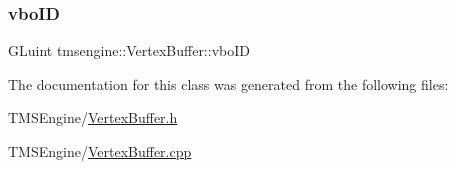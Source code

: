 \mbox{\label{classtmsengine_1_1_vertex_buffer_ab42f1676b7f61ab1b0e3ad9167914c41}} 
\subsubsection{\texorpdfstring{vbo\+ID}{vboID}}
{\footnotesize\ttfamily G\+Luint tmsengine\+::\+Vertex\+Buffer\+::vbo\+ID\hspace{0.3cm}{\ttfamily [private]}}



The documentation for this class was generated from the following files\+:\begin{DoxyCompactItemize}
\item 
T\+M\+S\+Engine/\hyperlink{_vertex_buffer_8h}{Vertex\+Buffer.\+h}\item 
T\+M\+S\+Engine/\hyperlink{_vertex_buffer_8cpp}{Vertex\+Buffer.\+cpp}\end{DoxyCompactItemize}
